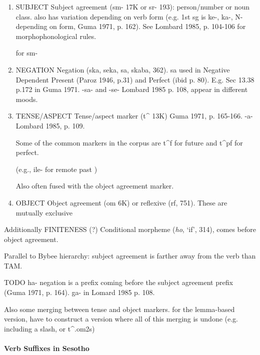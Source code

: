 \begin{enumerate}


    \item SUBJECT Subject agreement (sm- 17K or sr- 193): person/number or noun class. also has variation depending on verb form (e.g. 1st sg is ke-, ka-, N- depending on form, Guma 1971, p. 162). See Lombard 1985, p. 104-106 for morphophonological rules.
    
    \cite[]{doke1967textbook} for sm-
    
    \item NEGATION Negation (ska, seka, sa, skaba, 362). sa used in Negative Dependent Present (Paroz 1946, p.31) and Perfect (ibid p. 80). E.g. Sec 13.38 p.172 in Guma 1971. -sa- and -se- Lombard 1985 p. 108, appear in different moods.
    
    \item TENSE/ASPECT Tense/aspect marker (t\^{} 13K) Guma 1971, p. 165-166. -a- Lombard 1985, p. 109.
    
    Some of the common markers in the corpus are t\^{}f for future and t\^{}pf for perfect.
    
    (e.g., ile- for remote past \cite[]{doke1967textbook})
    
    Also often fused with the object agreement marker.
    
    
    \item OBJECT Object agreement (om 6K) or reflexive (rf, 751). These are mutually exclusive \cite[p. 165]{guma1971handbook}
\end{enumerate}

Additionally FINITENESS (?) Conditional morpheme (\emph{ho}, `if', 314), comes before object agreement.

Parallel to Bybee hierarchy: subject agreement is farther away from the verb than TAM.


TODO ha- negation is a prefix coming before the subject agreement prefix (Guma 1971, p. 164).  ga- in Lomard 1985 p. 108.



Also some merging between tense and object markers. for the lemma-based version, have to construct a version where all of this merging is undone (e.g. including a slash, or t\^{}.om2s)


\paragraph{Verb Suffixes in Sesotho}

